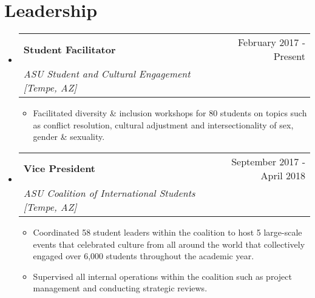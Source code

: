 \documentclass[letterpaper,11pt]{article}
\makeatletter
\newcommand{\sectionStart}{
  \begin{itemize}[label={},leftmargin=0in]
}
\newcommand{\sectionEnd}{
  \end{itemize}
}
\newcommand{\jobHeading}[3]{
  \vspace{-1pt}
  \item
  \begin{tabular*}{1.0\textwidth}{l@{\extracolsep{\fill}}r@{}}
    \normalsize{\textbf{#1}} & #2 \\
    \textit{\small#3} \\
  \end{tabular*}\vspace{-5pt}
}
\newcommand{\listStart}{\begin{itemize}}
\newcommand{\listEnd}{\end{itemize}\vspace{-5pt}}
\newcommand{\bulletItem}[1]{
  \item
  \small{
    {#1 \vspace{-1.8pt}}
  }
}
\makeatother
\begin{document}
\section{Leadership}
\sectionStart
  \jobHeading
    {Student Facilitator}
    {February 2017 - Present}
    {ASU Student and Cultural Engagement [Tempe, AZ]}
  \listStart
    \bulletItem
    {Facilitated diversity \& inclusion workshops for 80 students on topics such as conflict resolution, cultural adjustment and intersectionality of sex, gender \& sexuality.}
  \listEnd
  \jobHeading
    {Vice President}
    {September 2017 - April 2018}
    {ASU Coalition of International Students [Tempe, AZ]}
  \listStart
    \bulletItem
    {Coordinated 58 student leaders within the coalition to host 5 large-scale events that celebrated culture from all around the world that collectively engaged over 6,000 students throughout the academic year.}
    \bulletItem
    {Supervised all internal operations within the coalition such as project management and conducting strategic reviews.}
  \listEnd
\sectionEnd
\end{document}
